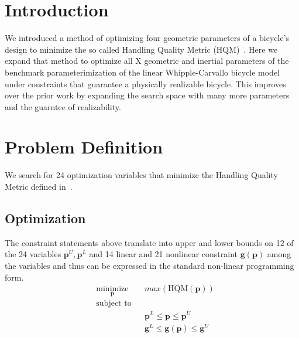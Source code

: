 \documentclass{bmd2019a}
\begin{document}
\section*{Introduction}
%
We introduced a method of optimizing four geometric parameters of a bicycle's
design to minimize the so called Handling Quality Metric
(HQM)~\cite{Moore2016}. Here we expand that method to optimize all X geometric
and inertial parameters of the benchmark parameterimization of the linear
Whipple-Carvallo bicycle model under constraints that guarantee a physically
realizable bicycle. This improves over the prior work by expanding the search
space with many more parameters and the guarntee of realizability.

\section*{Problem Definition}
%
We search for 24 optimization variables that minimize the Handling Quality
Metric defined in~\cite{Hess2012}.

\subsection*{Optimization}
%
The constraint statements above translate into upper and lower bounds on 12 of
the 24 variables $\mathbf{p}^U,\mathbf{p}^L$ and 14 linear and 21 nonlinear
constraint $\mathbf{g}(\mathbf{p})$ among the variables and thus can be
expressed in the standard non-linear programming form.
%
\begin{equation}
  \begin{aligned}
    & \underset{\mathbf{p}}{\text{minimize}} & & max(\textrm{HQM}(\mathbf{p})) \\
    & \text{subject to} & & \\
    & & & \mathbf{p}^L \leq \mathbf{p} \leq \mathbf{p}^U \\
    & & & \mathbf{g}^L \leq \mathbf{g}(\mathbf{p}) \leq \mathbf{g}^U \\
  \end{aligned}
\end{equation}
\end{document}
